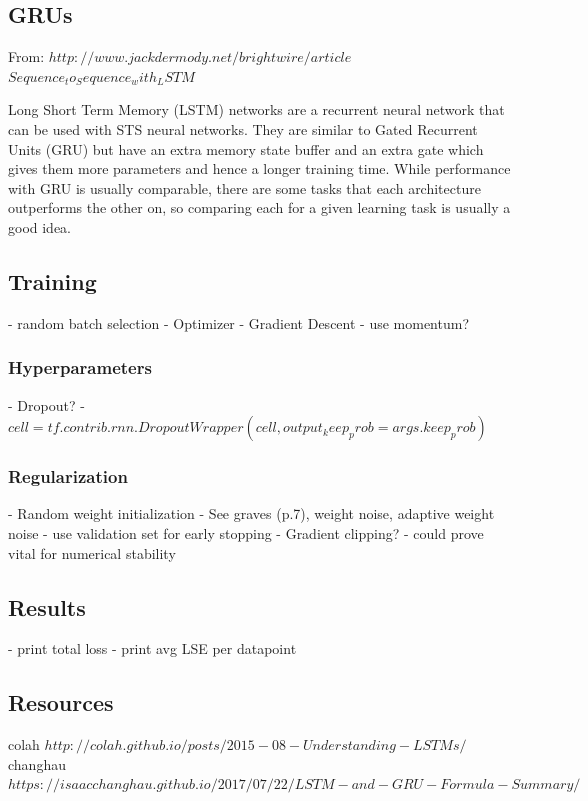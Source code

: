 \subsection{GRUs}
From: $http://www.jackdermody.net/brightwire/article$
$Sequence_to_Sequence_with_LSTM$

Long Short Term Memory (LSTM) networks are a recurrent neural network that can be used with STS neural networks. They are similar to Gated Recurrent Units (GRU) but have an extra memory state buffer and an extra gate which gives them more parameters and hence a longer training time. While performance with GRU is usually comparable, there are some tasks that each architecture outperforms the other on, so comparing each for a given learning task is usually a good idea.

\subsection{Training}
- random batch selection
- Optimizer
	- Gradient Descent
		- use momentum?

\subsubsection{Hyperparameters}
- Dropout?
	- $cell = tf.contrib.rnn.DropoutWrapper(cell, output_keep_prob = args.keep_prob)$

\subsubsection{Regularization}
- Random weight initialization
	- See graves (p.7), weight noise, adaptive weight noise
- use validation set for early stopping
- Gradient clipping?
	- could prove vital for numerical stability
	
\subsection{Results}
- print total loss
- print avg LSE per datapoint


\subsection{Resources}
colah $http://colah.github.io/posts/2015-08-Understanding-LSTMs/$
changhau $https://isaacchanghau.github.io/2017/07/22/LSTM-and-GRU-Formula-Summary/$
